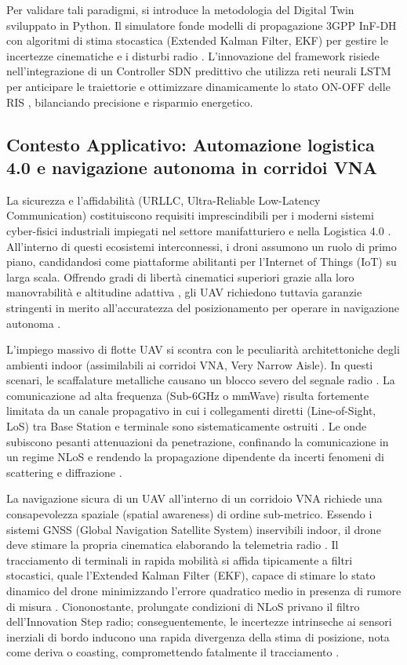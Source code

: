 \documentclass[twoside]{article}
\begin{document}
Per validare tali paradigmi, si introduce la metodologia del Digital Twin sviluppato in Python. Il simulatore fonde modelli di propagazione 3GPP InF-DH con algoritmi di stima stocastica (Extended Kalman Filter, EKF) per gestire le incertezze cinematiche e i disturbi radio \cite{Muller2024,Ye2023}. L'innovazione del framework risiede nell'integrazione di un Controller SDN predittivo che utilizza reti neurali LSTM per anticipare le traiettorie e ottimizzare dinamicamente lo stato ON-OFF delle RIS \cite{Wang2024,Khan2024}, bilanciando precisione e risparmio energetico.

\clearpage
\subsection{Contesto Applicativo: Automazione logistica 4.0 e navigazione autonoma in corridoi VNA}



La sicurezza e l'affidabilità (URLLC, Ultra-Reliable Low-Latency Communication) costituiscono requisiti imprescindibili per i moderni sistemi cyber-fisici industriali impiegati nel settore manifatturiero e nella Logistica 4.0 \cite{Lien2024}. All'interno di questi ecosistemi interconnessi, i droni assumono un ruolo di primo piano, candidandosi come piattaforme abilitanti per l'Internet of Things (IoT) su larga scala. Offrendo gradi di libertà cinematici superiori grazie alla loro manovrabilità e altitudine adattiva \cite{Yu2024}, gli UAV richiedono tuttavia garanzie stringenti in merito all'accuratezza del posizionamento per operare in navigazione autonoma \cite{Ye2023}.

L'impiego massivo di flotte UAV si scontra con le peculiarità architettoniche degli ambienti indoor (assimilabili ai corridoi VNA, Very Narrow Aisle). In questi scenari, le scaffalature metalliche causano un blocco severo del segnale radio \cite{Lien2024}. La comunicazione ad alta frequenza (Sub-6GHz o mmWave) risulta fortemente limitata da un canale propagativo in cui i collegamenti diretti (Line-of-Sight, LoS) tra Base Station e terminale sono sistematicamente ostruiti \cite{Muller2024}. Le onde subiscono pesanti attenuazioni da penetrazione, confinando la comunicazione in un regime NLoS e rendendo la propagazione dipendente da incerti fenomeni di scattering e diffrazione \cite{Gebretsadik2024}.

La navigazione sicura di un UAV all'interno di un corridoio VNA richiede una consapevolezza spaziale (spatial awareness) di ordine sub-metrico. Essendo i sistemi GNSS (Global Navigation Satellite System) inservibili indoor, il drone deve stimare la propria cinematica elaborando la telemetria radio \cite{Ye2023}. Il tracciamento di terminali in rapida mobilità si affida tipicamente a filtri stocastici, quale l'Extended Kalman Filter (EKF), capace di stimare lo stato dinamico del drone minimizzando l'errore quadratico medio in presenza di rumore di misura \cite{Muller2024,Ye2023}. Ciononostante, prolungate condizioni di NLoS privano il filtro dell'Innovation Step radio; conseguentemente, le incertezze intrinseche ai sensori inerziali di bordo inducono una rapida divergenza della stima di posizione, nota come deriva o coasting, compromettendo fatalmente il tracciamento \cite{Muller2024}.
\end{document}
